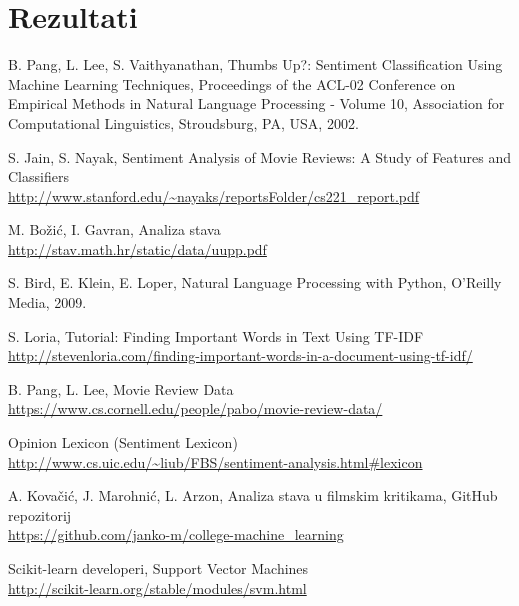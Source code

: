 \documentclass[conference]{IEEEtran}
\begin{document}
\section{Rezultati}

\begin{thebibliography}{1}

	B. Pang, L. Lee, S. Vaithyanathan,
 	Thumbs Up?: Sentiment Classification Using Machine Learning Techniques,
 	Proceedings of the ACL-02 Conference on Empirical Methods in Natural Language Processing - Volume 10,
 	Association for Computational Linguistics,
	Stroudsburg, PA, USA,
	2002.
	
	S. Jain, S. Nayak,
	Sentiment Analysis of Movie Reviews: A Study of Features and Classifiers\\
	\url{http://www.stanford.edu/~nayaks/reportsFolder/cs221_report.pdf}
	
	M. Božić, I. Gavran,
	Analiza stava\\
	\url{http://stav.math.hr/static/data/uupp.pdf}
	
	S. Bird, E. Klein, E. Loper,
	Natural Language Processing with Python,
	O'Reilly Media,
	2009.
	
	S. Loria,
	Tutorial: Finding Important Words in Text Using TF-IDF\\
	\url{http://stevenloria.com/finding-important-words-in-a-document-using-tf-idf/}

	B. Pang, L. Lee,
	Movie Review Data\\
	\url{https://www.cs.cornell.edu/people/pabo/movie-review-data/}
	
	Opinion Lexicon (Sentiment Lexicon)\\
	\url{http://www.cs.uic.edu/~liub/FBS/sentiment-analysis.html#lexicon}
	
	A. Kovačić, J. Marohnić, L. Arzon,
	Analiza stava u filmskim kritikama,
	GitHub repozitorij\\
	\url{https://github.com/janko-m/college-machine_learning}

    Scikit-learn developeri,
    Support Vector Machines\\
    \url{http://scikit-learn.org/stable/modules/svm.html}

\end{thebibliography}
\end{document}
